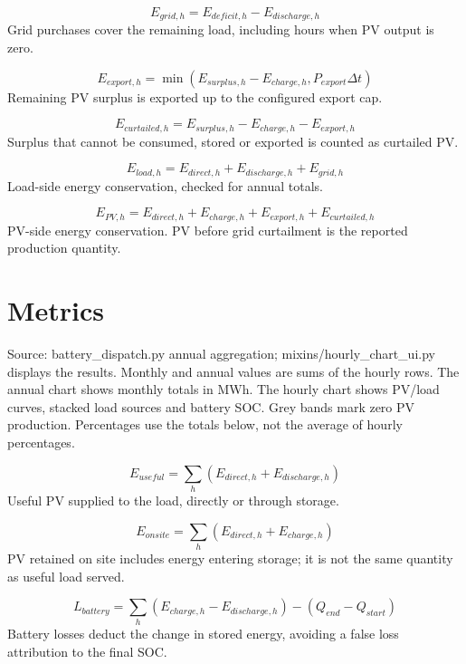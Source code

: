\documentclass[10pt,a4paper]{article}
\begin{document}
\begin{equation}
E_{grid,h}=E_{deficit,h}-E_{discharge,h}
\end{equation}
Grid purchases cover the remaining load, including hours when PV output is zero.

\begin{equation}
E_{export,h}=\min(E_{surplus,h}-E_{charge,h},P_{export}\Delta t)
\end{equation}
Remaining PV surplus is exported up to the configured export cap.

\begin{equation}
E_{curtailed,h}=E_{surplus,h}-E_{charge,h}-E_{export,h}
\end{equation}
Surplus that cannot be consumed, stored or exported is counted as curtailed PV.

\begin{equation}
E_{load,h}=E_{direct,h}+E_{discharge,h}+E_{grid,h}
\end{equation}
Load-side energy conservation, checked for annual totals.

\begin{equation}
E_{PV,h}=E_{direct,h}+E_{charge,h}+E_{export,h}+E_{curtailed,h}
\end{equation}
PV-side energy conservation. PV before grid curtailment is the reported production quantity.

\section{Metrics}
Source: battery\_dispatch.py annual aggregation; mixins/hourly\_chart\_ui.py displays the results. Monthly and annual values are sums of the hourly rows. The annual chart shows monthly totals in MWh. The hourly chart shows PV/load curves, stacked load sources and battery SOC. Grey bands mark zero PV production. Percentages use the totals below, not the average of hourly percentages.

\begin{equation}
E_{useful}=\sum_h(E_{direct,h}+E_{discharge,h})
\end{equation}
Useful PV supplied to the load, directly or through storage.

\begin{equation}
E_{onsite}=\sum_h(E_{direct,h}+E_{charge,h})
\end{equation}
PV retained on site includes energy entering storage; it is not the same quantity as useful load served.

\begin{equation}
L_{battery}=\sum_h(E_{charge,h}-E_{discharge,h})-(Q_{end}-Q_{start})
\end{equation}
Battery losses deduct the change in stored energy, avoiding a false loss attribution to the final SOC.
\end{document}
